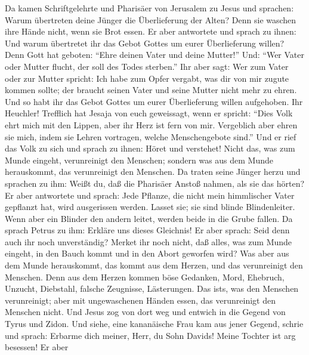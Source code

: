 Da kamen Schriftgelehrte und Pharisäer von Jerusalem zu
Jesus und sprachen:  Warum übertreten deine Jünger die
Überlieferung der Alten? Denn sie waschen ihre Hände nicht, wenn sie
Brot essen.  Er aber antwortete und sprach zu ihnen: Und
warum übertretet ihr das Gebot Gottes um eurer Überlieferung willen?
 Denn Gott hat geboten: ``Ehre deinen Vater und deine
Mutter!'' Und: ``Wer Vater oder Mutter flucht, der soll des Todes
sterben.''  Ihr aber sagt: Wer zum Vater oder zur Mutter
spricht: Ich habe zum Opfer vergabt, was dir von mir zugute kommen
sollte; der braucht seinen Vater und seine Mutter nicht mehr zu ehren.
 Und so habt ihr das Gebot Gottes um eurer Überlieferung
willen aufgehoben.  Ihr Heuchler! Trefflich hat Jesaja von
euch geweissagt, wenn er spricht:  ``Dies Volk ehrt mich
mit den Lippen, aber ihr Herz ist fern von mir. 
Vergeblich aber ehren sie mich, indem sie Lehren vortragen, welche
Menschengebote sind.''  Und er rief das Volk zu sich und
sprach zu ihnen: Höret und verstehet!  Nicht das, was zum
Munde eingeht, verunreinigt den Menschen; sondern was aus dem Munde
herauskommt, das verunreinigt den Menschen.  Da traten
seine Jünger herzu und sprachen zu ihm: Weißt du, daß die Pharisäer
Anstoß nahmen, als sie das hörten?  Er aber antwortete
und sprach: Jede Pflanze, die nicht mein himmlischer Vater gepflanzt
hat, wird ausgerissen werden.  Lasset sie; sie sind
blinde Blindenleiter. Wenn aber ein Blinder den andern leitet, werden
beide in die Grube fallen.  Da sprach Petrus zu ihm:
Erkläre uns dieses Gleichnis!  Er aber sprach: Seid denn
auch ihr noch unverständig?  Merket ihr noch nicht, daß
alles, was zum Munde eingeht, in den Bauch kommt und in den Abort
geworfen wird?  Was aber aus dem Munde herauskommt, das
kommt aus dem Herzen, und das verunreinigt den Menschen. 
Denn aus dem Herzen kommen böse Gedanken, Mord, Ehebruch, Unzucht,
Diebstahl, falsche Zeugnisse, Lästerungen.  Das
ist\textquotesingle s, was den Menschen verunreinigt; aber mit
ungewaschenen Händen essen, das verunreinigt den Menschen nicht.
 Und Jesus zog von dort weg und entwich in die Gegend von
Tyrus und Zidon.  Und siehe, eine kananäische Frau kam
aus jener Gegend, schrie und sprach: Erbarme dich meiner, Herr, du Sohn
Davids! Meine Tochter ist arg besessen!  Er aber

